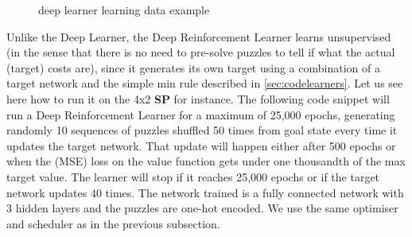 \begin{figure}[H]
  \noindent
  \caption[Examples]{deep learner learning data example}
  \label{fig:exampledeeplearnerlearning}
\end{figure}




\label{DRLSS}

Unlike the Deep Learner, the Deep Reinforcement Learner learns unsupervised (in the sense that there is no need to pre-solve puzzles to tell if what the actual (target) costs are), since it generates its own target using a combination of a target network and the simple min rule described in \ref{sec:codelearners}. Let us see here how to run it on the 4x2 \textbf{SP} for instance. The following code snippet will run a Deep Reinforcement Learner for a maximum of 25,000 epochs, generating randomly 10 sequences of puzzles shuffled 50 times from goal state every time it updates the target network. That update will happen either after 500 epochs or when the (MSE) loss on the value function gets under one thousandth of the max target value. The learner will stop if it reaches 25,000 epochs or if the target network updates 40 times. The network trained is a fully connected network with 3 hidden layers and the puzzles are one-hot encoded. We use the same optimiser and scheduler as in the previous subsection.

\afblue
